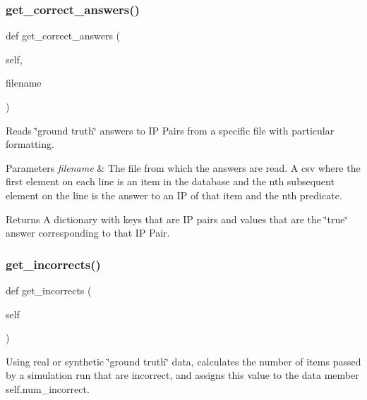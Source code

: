 \subsubsection{\texorpdfstring{get\+\_\+correct\+\_\+answers()}{get\_correct\_answers()}}
{\footnotesize\ttfamily def get\+\_\+correct\+\_\+answers (\begin{DoxyParamCaption}\item[{}]{self,  }\item[{}]{filename }\end{DoxyParamCaption})}



Reads \char`\"{}ground truth\char`\"{} answers to IP Pairs from a specific file with particular formatting. 


\begin{DoxyParams}{Parameters}
{\em filename} & The file from which the answers are read. A csv where the first element on each line is an item in the database and the nth subsequent element on the line is the answer to an IP of that item and the nth predicate. \\
\hline
\end{DoxyParams}
\begin{DoxyReturn}{Returns}
A dictionary with keys that are IP pairs and values that are the \char`\"{}true\char`\"{} answer corresponding to that IP Pair. 
\end{DoxyReturn}
\mbox{\label{classdynamicfilterapp_1_1test__simulations_1_1_simulation_test_a9adfa8688f12473b0c394cd3b7237be0}} 
\subsubsection{\texorpdfstring{get\+\_\+incorrects()}{get\_incorrects()}}
{\footnotesize\ttfamily def get\+\_\+incorrects (\begin{DoxyParamCaption}\item[{}]{self }\end{DoxyParamCaption})}



Using real or synthetic \char`\"{}ground truth\char`\"{} data, calculates the number of items passed by a simulation run that are incorrect, and assigns this value to the data member self.\+num\+\_\+incorrect. 

